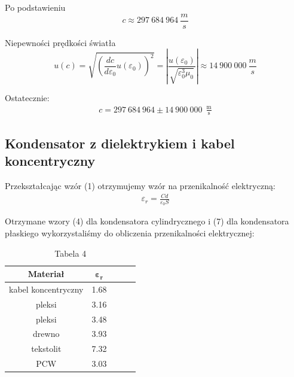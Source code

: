 \documentclass{fizykalab}
\begin{document}
{Po podstawieniu
\[ c \approx 297 \ 684 \ 964 \ \frac{m}{s}\]

Niepewności prędkości światła
\[ u(c) = \sqrt{\left(\frac{dc}{d\varepsilon_0} u(\varepsilon_0)\right)^2} = \left|\frac{u(\varepsilon_0)}{\sqrt{\varepsilon_0^3 \mu_0}}\right| \approx 14 \ 900 \ 000 \ \frac{m}{s}\]

Ostatecznie:
\begin{gather*} 
	\boxed{c = 297 \ 684 \ 964 \pm 14 \ 900 \ 000 \ \ \frac{\text{m}}{\text{s}} }
\end{gather*}

\newpage

\subsection*{Kondensator z dielektrykiem i kabel koncentryczny}
\par
Przekształcając wzór (1) otrzymujemy wzór na przenikalność elektryczną:
\begin{gather*} 
	\varepsilon_r = \frac{Cd}{\varepsilon_0 S}
	\tag{7}
\end{gather*}

Otrzymane wzory (4) dla kondensatora cylindrycznego i (7) dla kondensatora płaskiego wykorzystaliśmy do obliczenia przenikalności elektrycznej:
\begin{table}[H]
	\centering
	\begin{tabular}{|c|c|c|c|c|}
		\hline
		\textbf{Materiał} & $\boldsymbol{\varepsilon_r}$ \\ \hline
		kabel koncentryczny & 1.68 \\ \hline
		pleksi & 3.16 \\ \hline
		pleksi & 3.48 \\ \hline
		drewno & 3.93 \\ \hline
		tekstolit & 7.32 \\ \hline
		PCW & 3.03 \\ \hline
	\end{tabular}
	\caption*{Tabela 4}
\end{table}

}
\end{document}

